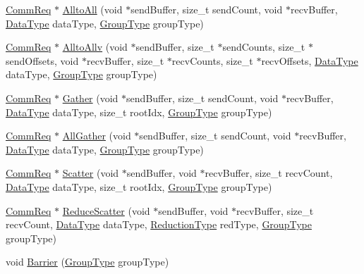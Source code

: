 \begin{DoxyCompactItemize}
\item 
\hyperlink{namespaceMLSL_aaf6e40eb1d3e48bb109f529d625e4087}{Comm\-Req} $\ast$ \hyperlink{classMLSL_1_1Distribution_a3e8e2d765cb7023bb7e66f2b3a209190}{Allto\-All} (void $\ast$send\-Buffer, size\-\_\-t send\-Count, void $\ast$recv\-Buffer, \hyperlink{namespaceMLSL_a09825f36959e78645dd9bc70bdf840ba}{Data\-Type} data\-Type, \hyperlink{namespaceMLSL_a9629292da8a376647d4b14a34cda9b95}{Group\-Type} group\-Type)
\item 
\hyperlink{namespaceMLSL_aaf6e40eb1d3e48bb109f529d625e4087}{Comm\-Req} $\ast$ \hyperlink{classMLSL_1_1Distribution_ad084740adee0f8fd8f13dacc2abf42b9}{Allto\-Allv} (void $\ast$send\-Buffer, size\-\_\-t $\ast$send\-Counts, size\-\_\-t $\ast$send\-Offsets, void $\ast$recv\-Buffer, size\-\_\-t $\ast$recv\-Counts, size\-\_\-t $\ast$recv\-Offsets, \hyperlink{namespaceMLSL_a09825f36959e78645dd9bc70bdf840ba}{Data\-Type} data\-Type, \hyperlink{namespaceMLSL_a9629292da8a376647d4b14a34cda9b95}{Group\-Type} group\-Type)
\item 
\hyperlink{namespaceMLSL_aaf6e40eb1d3e48bb109f529d625e4087}{Comm\-Req} $\ast$ \hyperlink{classMLSL_1_1Distribution_a9d4d04666d3e5c5dee225e0dc01df2e2}{Gather} (void $\ast$send\-Buffer, size\-\_\-t send\-Count, void $\ast$recv\-Buffer, \hyperlink{namespaceMLSL_a09825f36959e78645dd9bc70bdf840ba}{Data\-Type} data\-Type, size\-\_\-t root\-Idx, \hyperlink{namespaceMLSL_a9629292da8a376647d4b14a34cda9b95}{Group\-Type} group\-Type)
\item 
\hyperlink{namespaceMLSL_aaf6e40eb1d3e48bb109f529d625e4087}{Comm\-Req} $\ast$ \hyperlink{classMLSL_1_1Distribution_a5dae9afadecee65e8f60e084b5bc16a2}{All\-Gather} (void $\ast$send\-Buffer, size\-\_\-t send\-Count, void $\ast$recv\-Buffer, \hyperlink{namespaceMLSL_a09825f36959e78645dd9bc70bdf840ba}{Data\-Type} data\-Type, \hyperlink{namespaceMLSL_a9629292da8a376647d4b14a34cda9b95}{Group\-Type} group\-Type)
\item 
\hyperlink{namespaceMLSL_aaf6e40eb1d3e48bb109f529d625e4087}{Comm\-Req} $\ast$ \hyperlink{classMLSL_1_1Distribution_ab3de8f49c9c21f905fcc860c121dd01b}{Scatter} (void $\ast$send\-Buffer, void $\ast$recv\-Buffer, size\-\_\-t recv\-Count, \hyperlink{namespaceMLSL_a09825f36959e78645dd9bc70bdf840ba}{Data\-Type} data\-Type, size\-\_\-t root\-Idx, \hyperlink{namespaceMLSL_a9629292da8a376647d4b14a34cda9b95}{Group\-Type} group\-Type)
\item 
\hyperlink{namespaceMLSL_aaf6e40eb1d3e48bb109f529d625e4087}{Comm\-Req} $\ast$ \hyperlink{classMLSL_1_1Distribution_a7d65790975910bda14ac82b9d6156c5e}{Reduce\-Scatter} (void $\ast$send\-Buffer, void $\ast$recv\-Buffer, size\-\_\-t recv\-Count, \hyperlink{namespaceMLSL_a09825f36959e78645dd9bc70bdf840ba}{Data\-Type} data\-Type, \hyperlink{namespaceMLSL_a6513313f07b5a1b8b93ee7dd5557b27c}{Reduction\-Type} red\-Type, \hyperlink{namespaceMLSL_a9629292da8a376647d4b14a34cda9b95}{Group\-Type} group\-Type)
\item 
void \hyperlink{classMLSL_1_1Distribution_a196aac75af9ca05e371a348a956f9a8d}{Barrier} (\hyperlink{namespaceMLSL_a9629292da8a376647d4b14a34cda9b95}{Group\-Type} group\-Type)
\end{DoxyCompactItemize}


